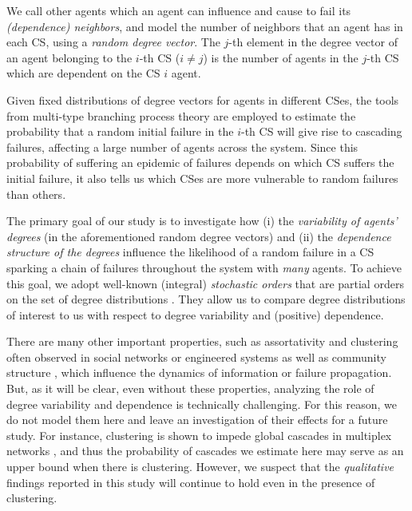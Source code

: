 \documentclass[10pt, journal, compsoc]{IEEEtran}
\begin{document}
We call other agents which an agent can 
influence and cause to fail 
its {\em (dependence) neighbors}, and 
model the number of neighbors that an agent
has in each CS, using a {\em random 
degree vector}. The $j$-th element in the 
degree vector of an agent belonging to  
the $i$-th CS ($i \neq j$) is the 
number of agents in the $j$-th CS which 
are dependent on the CS $i$ agent. 

Given fixed distributions of 
degree vectors for agents in different CSes, 
the tools from multi-type branching
process theory are employed to estimate 
the probability that a random initial failure 
in the $i$-th CS will give rise to cascading 
failures, affecting 
a large number of agents across the 
system. Since this probability of suffering
an epidemic of failures depends on which CS
suffers the initial failure, it also
tells us which CSes are more vulnerable to
random failures than others. 

The primary goal of our  study is to investigate 
how (i) the {\em variability of agents' degrees} 
(in the aforementioned random degree vectors) and 
(ii) the {\em dependence structure of the degrees} 
influence the likelihood of a random failure 
in a CS sparking a chain of failures throughout 
the system with {\em many} agents. 
To achieve this goal, we adopt well-known 
(integral) {\em stochastic  
orders} that are partial orders 
on the set of degree distributions
\cite{MullerStoyan, SO}. They 
allow us to compare degree distributions of
interest to us with respect to degree variability
and (positive) dependence.

There are many other important properties, such as 
assortativity \cite{Newman2002, Newman2003}
and clustering \cite{CoupLelarge, 
Zhuang2016} often observed in 
social networks or engineered systems as well 
as community structure \cite{Moharrami}, which 
influence the dynamics of information or failure 
propagation. But, as it will be clear, even without
these properties, analyzing the role of degree
variability and dependence is technically challenging.
For this reason, we do not model 
them here and leave an investigation of 
their effects for a future 
study. For instance, clustering is shown 
to impede global cascades in multiplex networks
\cite{Zhuang2016}, and thus the probability 
of cascades we estimate here may serve as
an upper bound when there is clustering. However, 
we suspect that the {\em qualitative} findings 
reported in this study will continue to hold even 
in the presence of clustering. 
\end{document}
